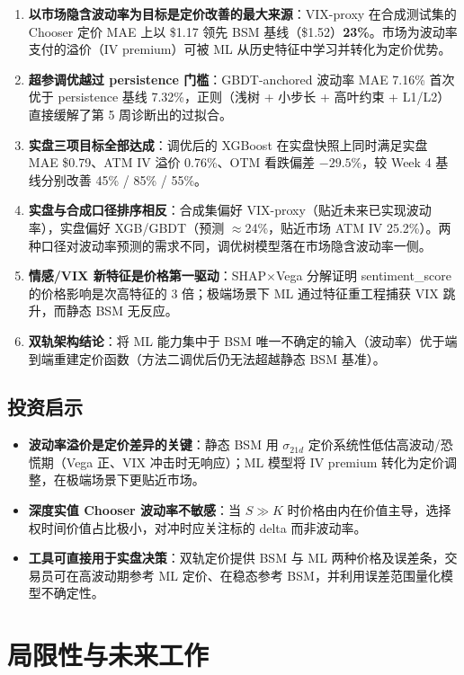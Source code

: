 \documentclass[11pt,a4paper]{article}
\begin{document}
\begin{enumerate}
  \item \textbf{以市场隐含波动率为目标是定价改善的最大来源}：VIX-proxy 在合成测试集的 Chooser 定价 MAE 上以 \$1.17 领先 BSM 基线（\$1.52）\textbf{23\%}。市场为波动率支付的溢价（IV premium）可被 ML 从历史特征中学习并转化为定价优势。
  \item \textbf{超参调优越过 persistence 门槛}：GBDT-anchored 波动率 MAE 7.16\% 首次优于 persistence 基线 7.32\%，正则（浅树 + 小步长 + 高叶约束 + L1/L2）直接缓解了第 5 周诊断出的过拟合。
  \item \textbf{实盘三项目标全部达成}：调优后的 XGBoost 在实盘快照上同时满足实盘 MAE \$0.79、ATM IV 溢价 0.76\%、OTM 看跌偏差 $-29.5\%$，较 Week 4 基线分别改善 45\% / 85\% / 55\%。
  \item \textbf{实盘与合成口径排序相反}：合成集偏好 VIX-proxy（贴近未来已实现波动率），实盘偏好 XGB/GBDT（预测 $\approx$24\%，贴近市场 ATM IV 25.2\%）。两种口径对波动率预测的需求不同，调优树模型落在市场隐含波动率一侧。
  \item \textbf{情感/VIX 新特征是价格第一驱动}：SHAP$\times$Vega 分解证明 sentiment\_score 的价格影响是次高特征的 3 倍；极端场景下 ML 通过特征重工程捕获 VIX 跳升，而静态 BSM 无反应。
  \item \textbf{双轨架构结论}：将 ML 能力集中于 BSM 唯一不确定的输入（波动率）优于端到端重建定价函数（方法二调优后仍无法超越静态 BSM 基准）。
\end{enumerate}

\subsection{投资启示}

\begin{itemize}
  \item \textbf{波动率溢价是定价差异的关键}：静态 BSM 用 $\sigma_{21d}$ 定价系统性低估高波动/恐慌期（Vega 正、VIX 冲击时无响应）；ML 模型将 IV premium 转化为定价调整，在极端场景下更贴近市场。
  \item \textbf{深度实值 Chooser 波动率不敏感}：当 $S\gg K$ 时价格由内在价值主导，选择权时间价值占比极小，对冲时应关注标的 delta 而非波动率。
  \item \textbf{工具可直接用于实盘决策}：双轨定价提供 BSM 与 ML 两种价格及误差条，交易员可在高波动期参考 ML 定价、在稳态参考 BSM，并利用误差范围量化模型不确定性。
\end{itemize}

\section{局限性与未来工作}
\end{document}
